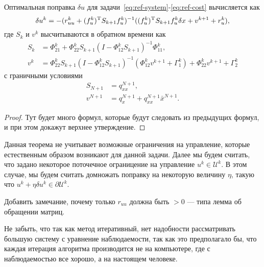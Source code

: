 \begin{theorem}
    Оптимальная поправка $\delta u$ для задачи~\eqref{eq:ref-system}-\eqref{eq:ref-cost} вычисляется как
    \begin{equation}
        \delta u^k = - (r^k_{uu} + (f^k_u)^\mathrm{T} S_{k+1} f^k_u)^{-1} ((f^k_u)^\mathrm{T} S_{k+1} f^k_u \delta x + v^{k+1} + r^k_u),
    \end{equation}
    где $S_k$ и $v^{k}$ высчитываются в обратном времени как
    \begin{equation}
        \begin{aligned}
            S_k &= \Phi^k_{21} + \Phi^k_{22} S_{k+1} (I - \Phi^k_{12}S_{k+1})^{-1} \Phi^k_{11},
            \\
            v^k &= \Phi^k_{22} S_{k+1} ( I - \Phi^k_{12} S_{k+1})^{-1} (\Phi^k_{12} v^{k+1} + \Gamma^k_1) + \Phi^k_{22} v^{k+1} + \Gamma^k_2
        \end{aligned}
    \end{equation}
    с граничными условиями
    \begin{equation}
        \begin{aligned}
            S_{N+1} &= q^{N+1}_{xx},
            \\
            v^{N+1} &= q^{N+1}_{x} + q^{N+1}_{xx}\bar x^{N+1}.
        \end{aligned}
    \end{equation}
\end{theorem}
\begin{proof}
    
    Тут будет много формул, которые будут следовать из предыдущих формул, и при этом докажут верхнее утверждение.

\end{proof}
\begin{remark}
    Данная теорема не учитывает возможные ограничения на управление, которые естественным образом возникают для данной задачи.
    Далее мы будем считать, что задано некоторое поточечное ограницение на управление $u^k \in \mathcal{U}^k$.
    В этом случае, мы будем считать домножать поправку на некоторую величину $\eta$, такую что $u^k + \eta \delta u^k \in \partial \mathcal{U}^k$.
\end{remark}

{\color{red} Добавить замечание, почему только $r_{uu}$ должна быть $> 0$ --- типа лемма об обращении матриц.}

{\color{red} Не забыть, что так как метод итеративный, нет надобности рассматривать большую систему с уравнение наблюдаемости, так как это предполагало бы, что каждая итерация алгоритма производится не на компьютере, где с наблюдаемостью все хорошо, а на настоящем человеке.}



